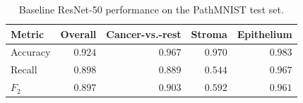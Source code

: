 \begin{table}[htbp]
    \centering
    \begin{tabular}{lrrrr}
        \toprule
        Metric & Overall & Cancer-vs.-rest & Stroma & Epithelium \\
        \midrule
        Accuracy & $0.924$ & $0.967$ & $0.970$ & $0.983$ \\
        Recall & $0.898$ & $0.889$ & $0.544$ & $0.967$ \\
        $F_2$ & $0.897$ & $0.903$ & $0.592$ & $0.961$ \\
        \bottomrule
    \end{tabular}
    \caption{Baseline ResNet-50 performance on the PathMNIST test set.}
    \label{tab:baseline-metrics}
\end{table}
